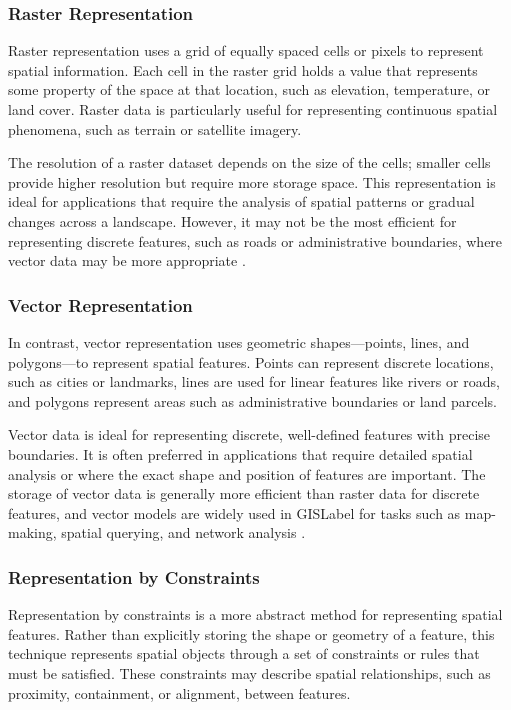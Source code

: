 \subsubsection{Raster Representation}\label{II-subsubsec:raster}
Raster representation uses a grid of equally spaced cells or pixels to represent spatial information. Each cell in the raster grid holds a value that represents some property of the space at that location, such as elevation, temperature, or land cover. Raster data is particularly useful for representing continuous spatial phenomena, such as terrain or satellite imagery.

The resolution of a raster dataset depends on the size of the cells; smaller cells provide higher resolution but require more storage space. This representation is ideal for applications that require the analysis of spatial patterns or gradual changes across a landscape. However, it may not be the most efficient for representing discrete features, such as roads or administrative boundaries, where vector data may be more appropriate \cite{burroughPrinciplesGeographicalInformation1986}.

\subsubsection{Vector Representation}\label{II-subsubsec:vector}
In contrast, vector representation uses geometric shapes—points, lines, and polygons—to represent spatial features. Points can represent discrete locations, such as cities or landmarks, lines are used for linear features like rivers or roads, and polygons represent areas such as administrative boundaries or land parcels.

Vector data is ideal for representing discrete, well-defined features with precise boundaries. It is often preferred in applications that require detailed spatial analysis or where the exact shape and position of features are important. The storage of vector data is generally more efficient than raster data for discrete features, and vector models are widely used in \acrshort{GISLabel} for tasks such as map-making, spatial querying, and network analysis \cite{goodchildGeographicalDataModeling1992}.

\subsubsection{Representation by Constraints}\label{II-subsubsec:constraint}
Representation by constraints is a more abstract method for representing spatial features. Rather than explicitly storing the shape or geometry of a feature, this technique represents spatial objects through a set of constraints or rules that must be satisfied. These constraints may describe spatial relationships, such as proximity, containment, or alignment, between features.


